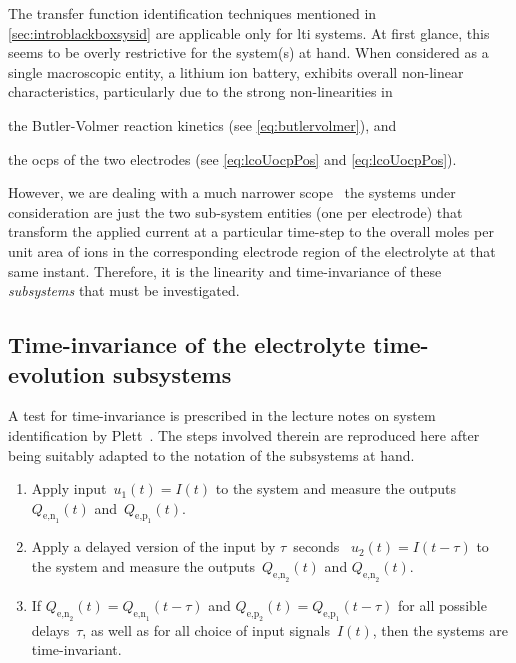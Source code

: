 

The      transfer     function      identification     techniques      mentioned
in \cref{sec:introblackboxsysid} are  applicable only for \gls{lti}  systems. At
first glance,  this seems to  be overly restrictive  for the system(s)  at hand.
When  considered  as  a  single  macroscopic  entity,  a  lithium  ion  battery,
exhibits  overall non-linear  characteristics,  particularly due  to the  strong
non-linearities in
\begin{enumerate*}[label=\emph{\alph*})]
    \item the Butler-Volmer reaction kinetics (see \cref{eq:butlervolmer}), and
    \item the \glspl{ocp} of the two electrodes (see \cref{eq:lcoUocpPos} and \cref{eq:lcoUocpPos}).
\end{enumerate*}
However,  we are  dealing with  a much  narrower scope  \ie~the  systems under
consideration  are just  the two  sub-system entities  (one per  electrode) that
transform the  applied current at  a particular  time-step to the  overall moles
per  unit area  of    ions in  the  corresponding  electrode region  of
the  electrolyte at  that  same  instant. Therefore,  it  is  the linearity  and
time-invariance of these \emph{subsystems} that must be investigated.

\subsection{Time-invariance of the electrolyte time-evolution subsystems}\label{subsec:timeinvariance}
A  test  for time-invariance  is  prescribed  in  the  lecture notes  on  system
identification by  Plett~\cite{PlettECE5560_02}. The steps involved  therein are
reproduced here after  being suitably adapted to the notation  of the subsystems
at hand.
\begin{enumerate}
    \item Apply input~${u_1(t) = I(t)}$ to the system and measure the outputs~$Q_{\text{e,n}_1}\!(t)$ and~$Q_{\text{e,p}_1}\!(t)$.
    \item Apply a delayed version of the input by $\tau$~seconds \ie~${u_2(t) = I(t-\tau)}$ to the system and measure the outputs~$Q_{\text{e,n}_2}\!(t)$ and $Q_{\text{e,n}_2}\!(t)$.
    \item If ${Q_{\text{e,n}_2}\!(t) = Q_{\text{e,n}_1}\!(t-\tau)}$ and
        ${Q_{\text{e,p}_2}\!(t) = Q_{\text{e,p}_1}\!(t-\tau)}$ for all possible
        delays~$\tau$, as well as for all choice of input signals~$I(t)$, then the systems are time-invariant.
\end{enumerate}

